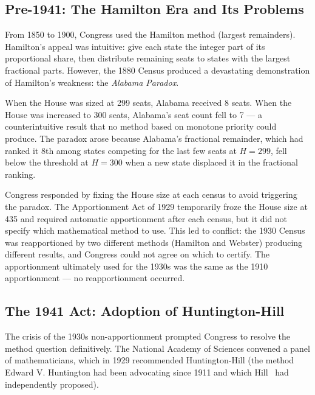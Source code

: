 \label{sec:history}

\subsection{Pre-1941: The Hamilton Era and Its Problems}

From 1850 to 1900, Congress used the Hamilton method (largest remainders).
Hamilton's appeal was intuitive: give each state the integer part of its
proportional share, then distribute remaining seats to states with the
largest fractional parts.
However, the 1880 Census produced a devastating demonstration of Hamilton's
weakness: the \emph{Alabama Paradox}.

When the House was sized at 299 seats, Alabama received 8 seats.
When the House was increased to 300 seats, Alabama's seat count fell to 7
--- a counterintuitive result that no method based on monotone priority
could produce.
The paradox arose because Alabama's fractional remainder, which had ranked
it 8th among states competing for the last few seats at $H=299$,
fell below the threshold at $H=300$ when a new state displaced it in the
fractional ranking.

Congress responded by fixing the House size at each census to avoid
triggering the paradox.
The Apportionment Act of 1929 \citep{apportionment1929} temporarily froze
the House size at 435 and required automatic apportionment after each
census, but it did not specify which mathematical method to use.
This led to conflict: the 1930 Census was reapportioned by two different
methods (Hamilton and Webster) producing different results,
and Congress could not agree on which to certify.
The apportionment ultimately used for the 1930s was the same as
the 1910 apportionment --- no reapportionment occurred.

\subsection{The 1941 Act: Adoption of Huntington-Hill}

The crisis of the 1930s non-apportionment prompted Congress to resolve
the method question definitively.
The National Academy of Sciences convened a panel of mathematicians,
which in 1929 recommended Huntington-Hill (the method Edward V.
Huntington had been advocating since 1911 and which Hill~\citeyearpar{hill1911apportionment}
had independently proposed).

